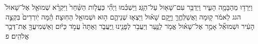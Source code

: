 \documentclass{openreader}
\begin{document}
וַיֵּרְד֥וּ מֵהַבָּמָ֖ה הָעִ֑יר וַיְדַבֵּ֥ר עִם־שָׁא֖וּל עַל־הַגָּֽג׃ 
וַיַּשְׁכִּ֗מוּ וַיְהִ֞י כַּעֲלֹ֤ות הַשַּׁ֨חַר֙ וַיִּקְרָ֨א שְׁמוּאֵ֤ל אֶל־שָׁאוּל֙ הגג לֵאמֹ֔ר ק֖וּמָה וַאֲשַׁלְּחֶ֑ךָּ וַיָּ֣קָם שָׁא֗וּל וַיֵּצְא֧וּ שְׁנֵיהֶ֛ם ה֥וּא וּשְׁמוּאֵ֖ל הַחֽוּצָה׃ 
הֵ֗מָּה יֹֽורְדִים֙ בִּקְצֵ֣ה הָעִ֔יר וּשְׁמוּאֵ֞ל אָמַ֣ר אֶל־שָׁא֗וּל אֱמֹ֥ר לַנַּ֛עַר וְיַעֲבֹ֥ר לְפָנֵ֖ינוּ וַֽיַּעֲבֹ֑ר וְאַתָּה֙ עֲמֹ֣ד כַּיֹּ֔ום וְאַשְׁמִיעֲךָ֖ אֶת־דְּבַ֥ר אֱלֹהִֽים׃ פ 
\end{document}
